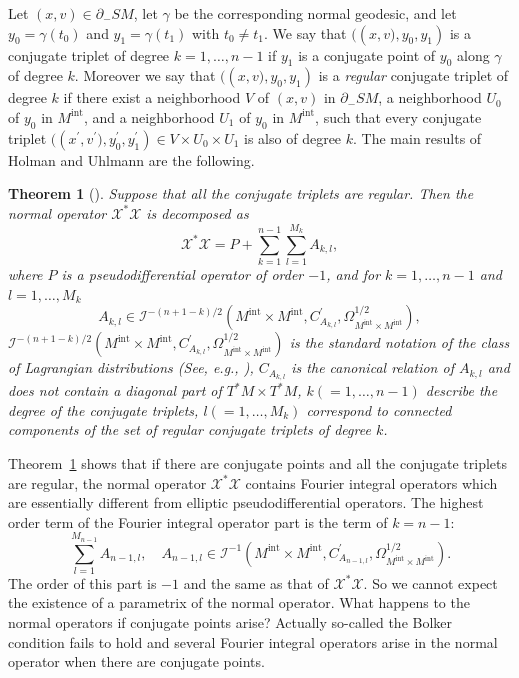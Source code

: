\documentclass[a4paper,11pt,reqno]{amsart}
\newtheorem{theorem}{Theorem}%
\theoremstyle{definition}
\theoremstyle{remark}
\begin{document}
Let $(x,v) \in \partial_-SM$, let $\gamma$ be the corresponding normal geodesic, 
and let  $y_0=\gamma(t_0)$ and $y_1=\gamma(t_1)$ with $t_0\ne{t_1}$. 
We say that $\bigl((x,v\bigr),y_0,y_1)$ is a conjugate triplet of degree $k=1,\dotsc,n-1$
if $y_1$ is a conjugate point of $y_0$ along $\gamma$ of degree $k$. 
Moreover we say that $\bigl((x,v\bigr),y_0,y_1)$ 
is a {\it regular} conjugate triplet of degree $k$ if there exist 
a neighborhood $V$ of $(x,v)$ in $\partial_-SM$, 
a neighborhood $U_0$ of $y_0$ in $M^\text{int}$, 
and 
a neighborhood $U_1$ of $y_0$ in $M^\text{int}$, 
such that every conjugate triplet 
$\bigl((x^\prime,v^\prime\bigr),y_0^\prime,y_1^\prime) \in V \times U_0 \times U_1$ 
is also of degree $k$. 
The main results of Holman and Uhlmann \cite{HolmanUhlmann} are the following. 
%
%
\begin{theorem}[{\cite[Theorem~4 in page 481]{HolmanUhlmann}}]
\label{theorem:hkust}
Suppose that all the conjugate triplets are regular. 
Then the normal operator $\mathcal{X}^\ast\mathcal{X}$ is decomposed as 
%
%
$$
\mathcal{X}^\ast\mathcal{X}
=
P
+
\sum_{k=1}^{n-1}
\sum_{l=1}^{M_k}
A_{k,l},
$$
%
%
where $P$ is a pseudodifferential operator of order $-1$, 
and for $k=1,\dots,n-1$ and $l=1,\dots,M_k$ 
%
%
$$
A_{k,l}
\in
\mathcal{I}^{-(n+1-k)/2}
(M^\text{int}{\times}M^\text{int},
C_{A_{k,l}}^\prime,
\Omega^{1/2}_{M^\text{int}{\times}M^\text{int}}), 
$$
%
%
$\mathcal{I}^{-(n+1-k)/2}(M^\text{int}{\times}M^\text{int},C_{A_{k,l}}^\prime,\Omega^{1/2}_{M^\text{int}{\times}M^\text{int}})$ 
is the standard notation of the class of Lagrangian distributions 
{\rm (}See, e.g., {\rm \cite{Hoermander4})},  
$C_{A_{k,l}}$ is the canonical relation of $A_{k,l}$ and does not contain a diagonal part of $T^\ast{M}{\times}T^\ast{M}$, 
$k (=1,\dotsc,n-1)$ describe the degree of the conjugate triplets, 
$l (=1,\dotsc,M_k)$ correspond to connected components of the set of regular conjugate triplets of degree $k$. 
\end{theorem} 
%
%
Theorem~\ref{theorem:hkust} shows that if there are conjugate points and all the conjugate triplets are regular, the normal operator $\mathcal{X}^\ast\mathcal{X}$ contains Fourier integral operators which are essentially different from elliptic pseudodifferential operators. The highest order term of the Fourier integral operator part is the term of $k=n-1$:
%
%
$$
\sum_{l=1}^{M_{n-1}}
A_{n-1,l}, 
\quad
A_{n-1,l}
\in
\mathcal{I}^{-1}
(M^\text{int}{\times}M^\text{int},
C_{A_{n-1,l}}^\prime,
\Omega^{1/2}_{M^\text{int}{\times}M^\text{int}}).
$$
%
%
The order of this part is $-1$ and the same as that of $\mathcal{X}^\ast\mathcal{X}$. So we cannot expect the existence of a parametrix of the normal operator. What happens to the normal operators if conjugate points arise? Actually so-called the Bolker condition fails to hold and several Fourier integral operators arise in the normal operator when there are conjugate points. 
\end{document}
